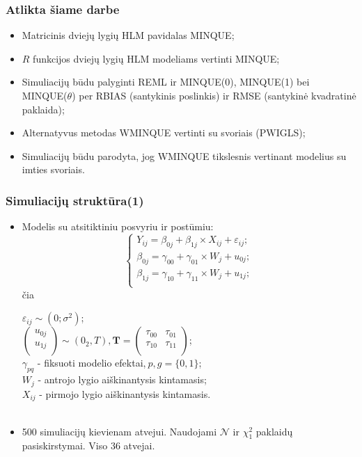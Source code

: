 \documentclass[utf8,hyperref={unicode,pdftex}]{beamer}
\begin{document}
\begin{frame}
\frametitle{Atlikta šiame darbe}
\begin{itemize}
\item Matricinis dviejų lygių HLM pavidalas MINQUE;
\item $R$ funkcijos dviejų lygių HLM modeliams vertinti MINQUE;
\item Simuliacijų būdu palyginti REML ir MINQUE(0), MINQUE(1) bei MINQUE($\theta$) per RBIAS (santykinis poslinkis) ir RMSE (santykinė kvadratinė paklaida);
\item Alternatyvus metodas WMINQUE vertinti su svoriais (PWIGLS);
\item Simuliacijų būdu parodyta, jog WMINQUE tikslesnis vertinant modelius su imties svoriais.
\end{itemize}
\end{frame}
\begin{frame}
\frametitle{Simuliacijų struktūra(1)}
\begin{itemize}
\item Modelis su atsitiktiniu posvyriu ir postūmiu:
\begin{equation*} \label{eq:2lvldelpish}
\left\{
\begin{array}{l}
Y_{ij} = \beta_{0j}+ \beta_{1j}\times X_{ij}+\varepsilon_{ij}; \\
\beta_{0j} = \gamma_{00} +\gamma_{01}\times W_{j}+u_{0j};\\
\beta_{1j} = \gamma_{10} +\gamma_{11}\times W_{j}+u_{1j};\\
\end{array} \right.
\end{equation*}
čia \\
\begin{small}
$\varepsilon_{ij}\sim \left(0;\sigma^2\right)$;\\
$\begin{pmatrix}
u_{0j} \\
u_{1j} \\
\end{pmatrix}\sim \left(0_2, T\right), \mathbf{T}=\begin{pmatrix}
\tau_{00} & \tau_{01} \\
\tau_{10} & \tau_{11} \\
\end{pmatrix}$; \\
$\gamma_{pq}$ - fiksuoti modelio efektai,$\ p,g = \{0,1\}$;\\
$W_j$ - antrojo lygio aiškinantysis kintamasis;\\
$X_{ij}$ - pirmojo lygio aiškinantysis kintamasis.\\ 
\ \\
\end{small}
\item 500 simuliacijų kievienam atvejui. Naudojami $\mathcal{N}$ ir $\chi^2_1$ paklaidų pasiskirstymai. Viso 36 atvejai.
\end{itemize}
\end{frame}
\end{document}
